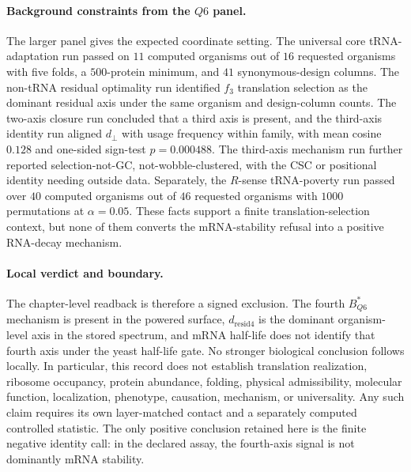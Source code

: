 \paragraph{Background constraints from the $Q6$ panel.}
The larger panel gives the expected coordinate setting.  The universal core tRNA-adaptation run passed on $11$ computed organisms out of $16$ requested organisms with five folds, a $500$-protein minimum, and $41$ synonymous-design columns.  The non-tRNA residual optimality run identified $f_3$ translation selection as the dominant residual axis under the same organism and design-column counts.  The two-axis closure run concluded that a third axis is present, and the third-axis identity run aligned $d_{\perp}$ with usage frequency within family, with mean cosine $0.128$ and one-sided sign-test $p=0.000488$.  The third-axis mechanism run further reported selection-not-GC, not-wobble-clustered, with the CSC or positional identity needing outside data.  Separately, the $R$-sense tRNA-poverty run passed over $40$ computed organisms out of $46$ requested organisms with $1000$ permutations at $\alpha=0.05$.  These facts support a finite translation-selection context, but none of them converts the mRNA-stability refusal into a positive RNA-decay mechanism.

\paragraph{Local verdict and boundary.}
The chapter-level readback is therefore a signed exclusion.  The fourth $B^{\ast}_{Q6}$ mechanism is present in the powered surface, $d_{\mathrm{resid4}}$ is the dominant organism-level axis in the stored spectrum, and mRNA half-life does not identify that fourth axis under the yeast half-life gate.  No stronger biological conclusion follows locally.  In particular, this record does not establish translation realization, ribosome occupancy, protein abundance, folding, physical admissibility, molecular function, localization, phenotype, causation, mechanism, or universality.  Any such claim requires its own layer-matched contact and a separately computed controlled statistic.  The only positive conclusion retained here is the finite negative identity call: in the declared assay, the fourth-axis signal is not dominantly mRNA stability.
